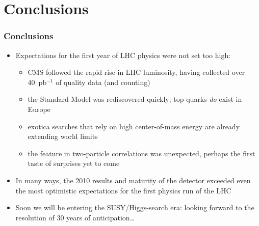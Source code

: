 \documentclass[compress]{beamer}
\begin{document}
\section*{Conclusions}
\begin{frame}
\frametitle{Conclusions}
\begin{itemize}
\item Expectations for the first year of LHC physics were not set too high:

\vspace{-0.2 cm}
\begin{itemize}\setlength{\itemsep}{0.2 cm}
\item CMS followed the rapid rise in LHC luminosity, having collected
  over 40~pb$^{-1}$ of quality data (and counting)
\item the Standard Model was rediscovered quickly; top quarks {\it do}
  exist in Europe
\item exotica searches that rely on high center-of-mass energy are
  already extending world limits
\item the feature in two-particle correlations was unexpected,
  perhaps the first taste of surprises yet to come
\end{itemize}

\item In many ways, the 2010 results and maturity of the detector
  exceeded even the most optimistic expectations for the first physics
  run of the LHC

\item Soon we will be entering the SUSY/Higgs-search era: looking
  forward to the resolution of 30 years of anticipation\ldots
\end{itemize}
\label{numpages}
\end{frame}
\end{document}
